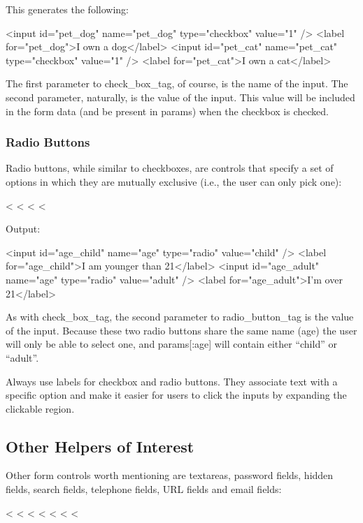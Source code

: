 \documentclass[10pt]{book}
\newenvironment{code}{%
  \scriptsize
    \verbatim
}{%
    \endverbatim
    \newline
}
\begin{document}
This generates the following:
\begin{code}
<input id="pet_dog" name="pet_dog" type="checkbox" value="1" />
<label for="pet_dog">I own a dog</label>
<input id="pet_cat" name="pet_cat" type="checkbox" value="1" />
<label for="pet_cat">I own a cat</label>
\end{code}

The first parameter to check\_box\_tag, of course, is the name  of the input. The second parameter, naturally, is the value of the  input. This value will be included in the form data (and be present in params) when the checkbox is checked.

\subsubsection{ Radio Buttons}

Radio buttons, while similar to checkboxes, are controls that specify  a set of options in which they are mutually exclusive (i.e., the user  can only pick one):
\begin{code}
<%
<%
<%
<%
\end{code}

Output:
\begin{code}
<input id="age_child" name="age" type="radio" value="child" />
<label for="age_child">I am younger than 21</label>
<input id="age_adult" name="age" type="radio" value="adult" />
<label for="age_adult">I'm over 21</label>
\end{code}

As with check\_box\_tag, the second parameter to radio\_button\_tag  is the value of the input. Because these two radio buttons share the  same name (age) the user will only be able to select one, and params[:age] will contain either “child” or “adult”.

Always use labels for checkbox and radio buttons.  They associate text with a specific option and make it easier for users  to click the inputs by expanding the clickable region.

\subsection{ Other Helpers of Interest}

Other form controls worth mentioning are textareas, password fields, hidden fields, search fields, telephone fields, URL fields and email fields:
\begin{code}
<%
<%
<%
<%
<%
<%
<%
\end{code}
\end{document}
